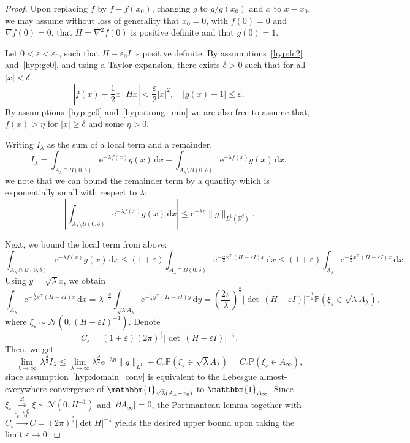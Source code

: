 \documentclass[10pt]{article}
\newcommand{\cL}{\mathcal{L}}
\renewcommand{\d}{\mathrm{d}}
\newcommand{\e}{\mathrm{e}}
\renewcommand{\P}{\mathbb{P}}
\newcommand{\R}{\mathbb{R}}
\newcommand{\1}{\mathbbm 1}
\begin{document}
    \begin{proof}
        Upon replacing $f$ by $f-f(x_0)$, changing $g$ to $g/g(x_0)$ and $x$ to $x-x_0$, we may assume without loss of generality that $x_0 = 0$, with $f(0)=0$ and $\nabla f(0) = 0$, that $H=\nabla^2 f(0)$ is positive definite and that $g(0)=1$.

        Let $0<\varepsilon<\varepsilon_0$, such that $H-\varepsilon_0 I$ is positive definite. By assumptions~\ref{hyp:fc2} and~\ref{hyp:gc0}, and using a Taylor expansion, there exists $\delta>0$ such that for all $|x|<\delta$.
        $$ \left|f(x)-\frac12x^\intercal H x \right|<\frac\varepsilon2 |x|^2,\quad |g(x)-1|\leq \varepsilon,$$
        By assumptions~\ref{hyp:gc0} and~\ref{hyp:strong_min} we are also free to assume that, $f(x) > \eta$ for $|x|\geq \delta$ and some $\eta>0$.

        Writing $I_\lambda$ as the sum of a local term and a remainder,
        \begin{equation}
            \label{eq:l7_pf1}
            I_\lambda = \int_{A_\lambda \cap B(0,\delta)} \e^{-\lambda f(x)}g(x)\,\d x + \int_{A_\lambda\setminus B(0,\delta)}\e^{-\lambda f(x)}g(x)\,\d x,
        \end{equation}
        we note that we can bound the remainder term by a quantity which is exponentially small with respect to $\lambda$:
        $$\left|\int_{A_\lambda\setminus B(0,\delta)} \e^{-\lambda f(x)}g(x)\,\d x \right| \leq \e^{-\lambda \eta} \| g\|_{L^1(\R^d)}.$$

        Next, we bound the local term from above: 
        \[\int_{A_\lambda \cap B(0,\delta)} \e^{-\lambda f(x)}g(x)\,\d x \leq (1+\varepsilon)\int_{A_\lambda \cap B(0,\delta)}\e^{-\frac\lambda2x^\intercal (H-\varepsilon I) x}\,\d x \leq (1+\varepsilon)\int_{A_\lambda}\e^{-\frac\lambda 2x^\intercal(H-\varepsilon I)x}\,\d x.\]
        Using $y=\sqrt\lambda x$, we obtain
        \[\int_{A_\lambda} \e^{-\frac\lambda2 x^\intercal (H-\varepsilon I)x}\,\d x  = \lambda^{-\frac d2}\int_{\sqrt\lambda A_\lambda}\e^{-\frac12 y^\intercal (H-\varepsilon I) y}\,\d y = \left(\frac{2\pi}\lambda\right)^{\frac d2}|\det\,(H-\varepsilon I)|^{-\frac12}\P(\xi_{\varepsilon} \in \sqrt\lambda A_\lambda),\]
        where $\xi_\varepsilon \sim \mathcal N(0,(H-\varepsilon I)^{-1})$. Denote 
        \[C_\varepsilon = (1+\varepsilon)\left(2\pi\right)^{\frac d2}|\det\,(H-\varepsilon I)|^{-\frac12}.\]
        Then, we get
        \[\underset{\lambda\to\infty}{\overline{\lim}}\,\lambda^{\frac d2}{I_\lambda}\leq \underset{\lambda\to\infty}{\overline{\lim}} \lambda^{\frac d2}\e^{-\lambda\eta}\|g\|_{L^1}  + C_\varepsilon\P(\xi_\varepsilon\in\sqrt\lambda A_\lambda) = C_\varepsilon\P(\xi_\varepsilon \in A_\infty),\]
        since assumption~\ref{hyp:domain_conv} is equivalent to the Lebesgue almost-everywhere convergence of $\mathbbm{1}_{\sqrt\lambda (A_\lambda-x_0)}$ to $\mathbbm{1}_{A_\infty}$.
        Since $\xi_\varepsilon \overset{\cL}{\underset{\varepsilon\to 0}{\longrightarrow}} \xi \sim \mathcal N(0,H^{-1})$ and $|\partial A_\infty|=0$, the Portmanteau lemma together with $C_\varepsilon \overset{\varepsilon_\to 0}{\longrightarrow} C = (2\pi)^{\frac d2} | \det H|^{-\frac12}$ yields the desired upper bound upon taking the limit $\varepsilon\to 0$.


\end{proof}
\end{document}
